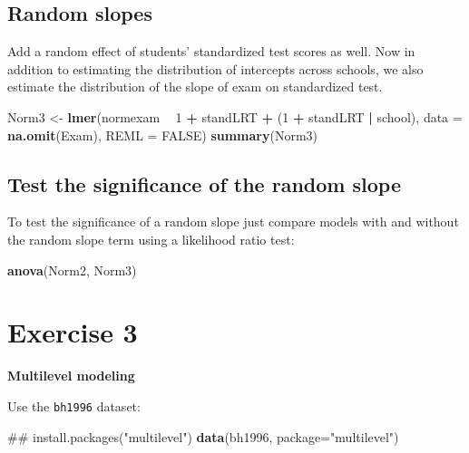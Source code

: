 \documentclass[]{book}
\newenvironment{Shaded}{\begin{snugshade}}{\end{snugshade}}
\newcommand{\KeywordTok}[1]{\textcolor[rgb]{0.13,0.29,0.53}{\textbf{#1}}}
\newcommand{\DataTypeTok}[1]{\textcolor[rgb]{0.13,0.29,0.53}{#1}}
\newcommand{\DecValTok}[1]{\textcolor[rgb]{0.00,0.00,0.81}{#1}}
\newcommand{\StringTok}[1]{\textcolor[rgb]{0.31,0.60,0.02}{#1}}
\newcommand{\OtherTok}[1]{\textcolor[rgb]{0.56,0.35,0.01}{#1}}
\newcommand{\OperatorTok}[1]{\textcolor[rgb]{0.81,0.36,0.00}{\textbf{#1}}}
\newcommand{\NormalTok}[1]{#1}
\begin{document}
\subsection{Random slopes}\label{random-slopes}

Add a random effect of students' standardized test scores as well. Now
in addition to estimating the distribution of intercepts across schools,
we also estimate the distribution of the slope of exam on standardized
test.

\begin{Shaded}
\begin{Highlighting}[]
\NormalTok{  Norm3 <-}\StringTok{ }\KeywordTok{lmer}\NormalTok{(normexam }\OperatorTok{~}\StringTok{ }\DecValTok{1} \OperatorTok{+}\StringTok{ }\NormalTok{standLRT }\OperatorTok{+}\StringTok{ }\NormalTok{(}\DecValTok{1} \OperatorTok{+}\StringTok{ }\NormalTok{standLRT }\OperatorTok{|}\StringTok{ }\NormalTok{school), }
                \DataTypeTok{data =} \KeywordTok{na.omit}\NormalTok{(Exam), }\DataTypeTok{REML =} \OtherTok{FALSE}\NormalTok{) }
  \KeywordTok{summary}\NormalTok{(Norm3) }
\end{Highlighting}
\end{Shaded}

\subsection{Test the significance of the random
slope}\label{test-the-significance-of-the-random-slope}

To test the significance of a random slope just compare models with and
without the random slope term using a likelihood ratio test:

\begin{Shaded}
\begin{Highlighting}[]
  \KeywordTok{anova}\NormalTok{(Norm2, Norm3) }
\end{Highlighting}
\end{Shaded}

\section{Exercise 3}\label{exercise-3-1}

\textbf{Multilevel modeling}

Use the \texttt{bh1996} dataset:

\begin{Shaded}
\begin{Highlighting}[]
\NormalTok{## install.packages("multilevel")}
\KeywordTok{data}\NormalTok{(bh1996, }\DataTypeTok{package=}\StringTok{"multilevel"}\NormalTok{)}
\end{Highlighting}
\end{Shaded}
\end{document}
